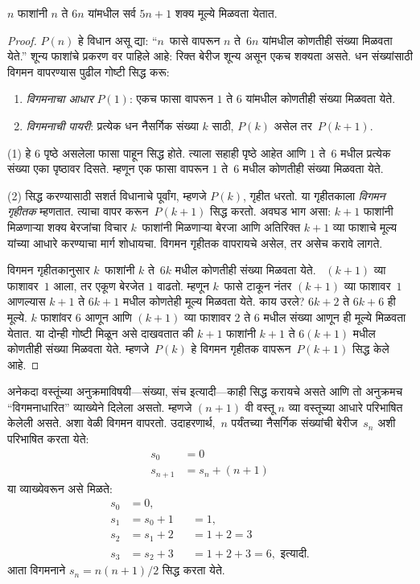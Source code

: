 \begin{thm}
$n$ फाशांनी $n$ ते $6n$ यांमधील सर्व $5n+1$ शक्य मूल्ये मिळवता येतात.
\end{thm}

\begin{proof}
$P(n)$ हे विधान असू द्या: “$n$~फासे वापरून $n$ ते~$6n$ यांमधील कोणतीही संख्या मिळवता येते.” शून्य फाशांचे प्रकरण वर पाहिले आहे: रिक्त बेरीज शून्य असून एकच शक्यता असते. धन संख्यांसाठी विगमन वापरण्यास पुढील गोष्टी सिद्ध करू:
\begin{enumerate}
\item \emph{विगमनाचा आधार} $P(1)$: एकच फासा वापरून $1$ ते $6$ यांमधील कोणतीही संख्या मिळवता येते.
\item \emph{विगमनाची पायरी}: प्रत्येक धन नैसर्गिक संख्या $k$ साठी, $P(k)$ असेल तर~$P(k+1)$.
\end{enumerate}

(1) हे $6$ पृष्ठे असलेला फासा पाहून सिद्ध होते. त्याला सहाही पृष्ठे आहेत आणि $1$ ते~$6$ मधील प्रत्येक संख्या एका पृष्ठावर दिसते. म्हणून एक फासा वापरून $1$ ते~$6$ मधील कोणतीही संख्या मिळवता येते.

(2) सिद्ध करण्यासाठी सशर्त विधानाचे पूर्वांग, म्हणजे $P(k)$, गृहीत धरतो. या गृहीतकाला \emph{विगमन गृहीतक} म्हणतात. त्याचा वापर करून~$P(k+1)$ सिद्ध करतो. अवघड भाग असा: $k+1$ फाशांनी मिळणाऱ्या शक्य बेरजांचा विचार $k$~फाशांनी मिळणाऱ्या बेरजा आणि अतिरिक्त $k+1$ व्या फाशाचे मूल्य यांच्या आधारे करण्याचा मार्ग शोधायचा. विगमन गृहीतक वापरायचे असेल, तर असेच करावे लागते.

विगमन गृहीतकानुसार $k$~फाशांनी $k$ ते~$6k$ मधील कोणतीही संख्या मिळवता येते. ~$(k+1)$ व्या फाशावर~$1$ आला, तर एकूण बेरजेत $1$ वाढतो. म्हणून $k$~फासे टाकून नंतर $(k+1)$ व्या फाशावर~$1$ आणल्यास $k+1$ ते $6k+1$ मधील कोणतेही मूल्य मिळवता येते. काय उरले? $6k+2$ ते $6k+6$ ही मूल्ये. $k$ फाशांवर $6$ आणून आणि $(k+1)$ व्या फाशावर $2$ ते $6$ मधील संख्या आणून ही मूल्ये मिळवता येतात. या दोन्ही गोष्टी मिळून असे दाखवतात की $k+1$ फाशांनी $k+1$ ते $6(k+1)$ मधील कोणतीही संख्या मिळवता येते. म्हणजे~$P(k)$ हे विगमन गृहीतक वापरून~$P(k+1)$ सिद्ध केले आहे.
\end{proof}

अनेकदा वस्तूंच्या अनुक्रमाविषयी---संख्या, संच इत्यादी---काही सिद्ध करायचे असते आणि तो अनुक्रमच “विगमनाधारित” व्याख्येने दिलेला असतो. म्हणजे $(n+1)$ वी वस्तू $n$ व्या वस्तूच्या आधारे परिभाषित केलेली असते. अशा वेळी विगमन वापरतो. उदाहरणार्थ,~$n$ पर्यंतच्या नैसर्गिक संख्यांची बेरीज~$s_n$ अशी परिभाषित करता येते:
\begin{align*}
  s_0 & = 0\\
  s_{n+1} & = s_n + (n+1)
\end{align*}
या व्याख्येवरून असे मिळते:
\begin{align*}
  s_0 & = 0,\\
  s_1 & = s_0 + 1 && = 1,\\
  s_2 & = s_1 + 2 && = 1 + 2 = 3\\
  s_3 & = s_2 + 3 && = 1 + 2 + 3 = 6, \text{ इत्यादी.}
\end{align*}
आता विगमनाने $s_n = n(n+1)/2$ सिद्ध करता येते.


